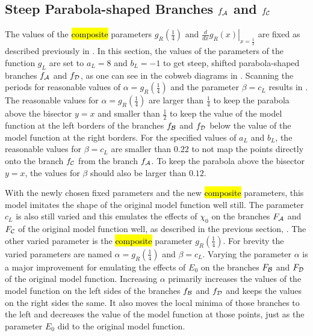 \subsection{Steep Parabola-shaped Branches $f_{\mathcal{A}}$ and $f_{\mathcal{C}}$}
\label{sec:setup.quad.hyper.1}

The values of the \hl{composite} parameters $g_R\left(\frac{1}{4}\right)$ and $\left. \frac{d}{dx} g_R\left(x\right) \right|_{x = \frac{1}{2}}$ are fixed as described previously in .
In this section, the values of the parameters of the function $g_L$ are set to $a_L = 8$ and $b_L = -1$ to get steep, shifted parabola-shaped branches $f_{\mathcal{A}}$ and $f_{\mathcal{D}}$, as one can see in the cobweb diagrams in .
Scanning the periods for reasonable values of $\alpha = g_R\left(\frac{1}{4}\right)$ and the parameter $\beta = c_L$ results in .
The reasonable values for $\alpha = g_R\left(\frac{1}{4}\right)$ are larger than $\frac{1}{4}$ to keep the parabola above the bisector $y = x$ and smaller than $\frac{1}{2}$ to keep the value of the model function at the left borders of the branches $f_{\mathcal{B}}$ and $f_{\mathcal{D}}$ below the value of the model function at the right borders.
For the specified values of $a_L$ and $b_L$, the reasonable values for $\beta = c_L$ are smaller than $0.22$ to not map the points directly onto the branch $f_{\mathcal{C}}$ from the branch $f_{\mathcal{A}}$.
To keep the parabola above the bisector $y = x$, the values for $\beta$ should also be larger than $0.12$.

With the newly chosen fixed parameters and the new \hl{composite} parameters, this model imitates the shape of the original model function well still.
The parameter $c_L$ is also still varied and this emulates the effects of $\chi_0$ on the branches $F_{\mathcal{A}}$ and $F_{\mathcal{C}}$ of the original model function well, as described in the previous section, .
The other varied parameter is the \hl{composite} parameter $g_R\left(\frac{1}{4}\right)$.
For brevity the varied parameters are named $\alpha = g_R\left(\frac{1}{4}\right)$ and $\beta = c_L$.
Varying the parameter $\alpha$ is a major improvement for emulating the effects of $E_0$ on the branches $F_{\mathcal{B}}$ and $F_{\mathcal{D}}$ of the original model function.
Increasing $\alpha$ primarily increases the values of the model function on the left sides of the branches $f_{\mathcal{B}}$ and $f_{\mathcal{D}}$ and keeps the values on the right sides the same.
It also moves the local minima of those branches to the left and decreases the value of the model function at those points, just as the parameter $E_0$ did to the original model function.

